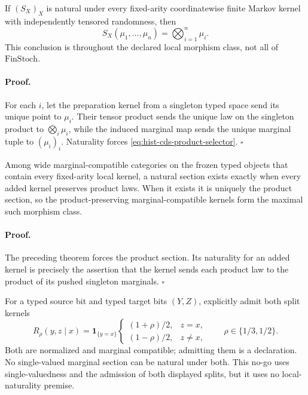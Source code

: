 If \((S_X)_X\) is natural under every fixed-arity coordinatewise finite
Markov kernel with independently tensored randomness, then
\begin{equation}
S_X(\mu_1,\ldots,\mu_n)=\bigotimes_{i=1}^n\mu_i.
\label{eq:hist-cds-product-selector}
\end{equation}
This conclusion is throughout the declared local morphism class, not all of
\(\mathrm{FinStoch}\).  

\paragraph{Proof.}
For each \(i\), let the preparation kernel from a singleton typed space send
its unique point to \(\mu_i\).  Their tensor product sends the unique law on
the singleton product to \(\bigotimes_i\mu_i\), while the induced marginal
map sends the unique marginal tuple to \((\mu_i)_i\).  Naturality forces
\eqref{eq:hist-cds-product-selector}.  \(\square\)

Among wide marginal-compatible categories on the frozen typed objects that
contain every fixed-arity local kernel, a natural section exists exactly when
every added kernel preserves product laws.  When it exists it is uniquely the
product section, so the product-preserving marginal-compatible kernels form
the maximal such morphism class.  

\paragraph{Proof.}
The preceding theorem forces the product section.  Its naturality for an
added kernel is precisely the assertion that the kernel sends each product
law to the product of its pushed singleton marginals.  \(\square\)

For a typed source bit and typed target bits \((Y,Z)\), explicitly admit both
split kernels
\begin{equation}
R_\rho(y,z\mid x)
=\mathbf1_{\{y=x\}}\begin{cases}
(1+\rho)/2,&z=x,\\
(1-\rho)/2,&z\ne x,
\end{cases}
\qquad \rho\in\{1/3,1/2\}.
\label{eq:hist-cds-split-kernel}
\end{equation}
Both are normalized and marginal compatible; admitting them is a declaration.  No
single-valued marginal section can be natural under both.  This no-go uses
single-valuedness and the admission of both displayed splits, but it uses no
local-naturality premise.  

